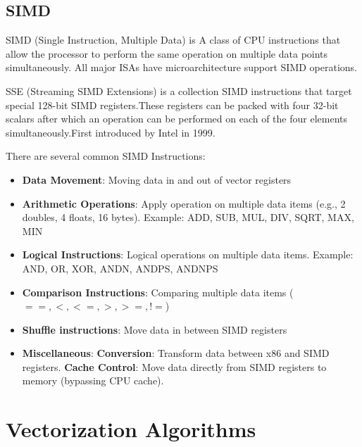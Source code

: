 \documentclass[11pt]{article}
\begin{document}
\subsection*{SIMD}
SIMD (Single Instruction, Multiple Data) is A class of CPU instructions that allow the processor to perform the same operation on multiple data points simultaneously. All major ISAs have microarchitecture support SIMD operations.

SSE (Streaming SIMD Extensions) is a collection SIMD instructions that target special 128-bit SIMD registers.These registers can be packed with four 32-bit scalars after which an operation can be performed on each of the four elements simultaneously.First introduced by Intel in 1999.

There are several common SIMD Instructions:
\begin{itemize}
	\item 
	\textbf{Data Movement}: 
	Moving data in and out of vector registers
	
	\item 
	\textbf{Arithmetic Operations}: 
	Apply operation on multiple data items (e.g., 2 doubles, 4 floats, 16 bytes).
	Example: ADD, SUB, MUL, DIV, SQRT, MAX, MIN
	
	\item 
	\textbf{Logical Instructions}:
	Logical operations on multiple data items.
	Example: AND, OR, XOR, ANDN, ANDPS, ANDNPS
	
	\item 
	\textbf{Comparison Instructions}:
	Comparing multiple data items ($==,<,<=,>,>=,!=$)
	
	\item 
	\textbf{Shuffle instructions}:
	Move data in between SIMD registers
	
	\item 
	\textbf{Miscellaneous}:
	\textbf{Conversion}: Transform data between x86 and SIMD registers.
	\textbf{Cache Control}: Move data directly from SIMD registers to memory (bypassing CPU cache).
\end{itemize}


\section{Vectorization Algorithms}
\end{document}
